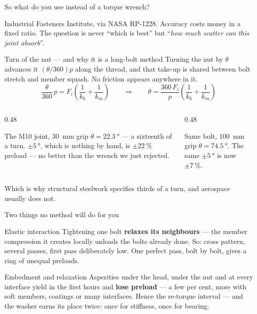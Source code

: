 \documentclass[aspectratio=169,10pt]{beamer}
\begin{document}
\begin{frame}{So what do you use instead of a torque wrench?}
\centering
\resizebox{!}{4.5cm}{}
\vfill
\raggedright
{\footnotesize Industrial Fasteners Institute, via NASA RP-1228.} Accuracy costs money in a fixed
ratio. The question is never ``which is best'' but ``\emph{how much scatter can this joint
absorb}''.
\end{frame}

\begin{frame}{Turn of the nut --- and why it is a long-bolt method}
Turning the nut by $\theta$ advances it $(\theta/360)p$ along the thread, and that take-up is shared
between bolt stretch and member squash. \alert{No friction appears anywhere in it.}
\[
\frac{\theta}{360}\,p = F_i\!\left(\frac{1}{k_b}+\frac{1}{k_m}\right)
\qquad\Longrightarrow\qquad
\theta = \frac{360\,F_i}{p}\left(\frac{1}{k_b}+\frac{1}{k_m}\right)
\]
\vfill
\begin{columns}[T]
\begin{column}{0.48\textwidth}
\begin{block}{The M10 joint, \SI{30}{mm} grip}
$\theta = \SI{22.3}{\degree}$ --- a sixteenth of a turn.
\vspace{2pt}
$\pm\SI{5}{\degree}$, which is nothing by hand, is \alert{$\pm\SI{22}{\percent}$ preload} --- no
better than the wrench we just rejected.
\end{block}
\end{column}
\begin{column}{0.48\textwidth}
\begin{block}{Same bolt, \SI{100}{mm} grip}
$\theta = \SI{74.5}{\degree}$.
\vspace{2pt}
The same $\pm\SI{5}{\degree}$ is now $\pm\SI{7}{\percent}$.
\end{block}
\end{column}
\end{columns}
\vfill
\centering
Which is why structural steelwork specifies thirds of a turn, and aerospace usually does not.
\end{frame}

\begin{frame}{Two things no method will do for you}
\begin{alertblock}{Elastic interaction}
Tightening one bolt \textbf{relaxes its neighbours} --- the member compression it creates locally
unloads the bolts already done.
\vspace{2pt}
So: cross pattern, several passes, first pass deliberately low. One perfect pass, bolt by bolt,
gives a ring of unequal preloads.
\end{alertblock}
\vfill
\begin{alertblock}{Embedment and relaxation}
Asperities under the head, under the nut and at every interface yield in the first hours and
\textbf{lose preload} --- a few per cent, more with soft members, coatings or many interfaces.
\vspace{2pt}
Hence the re-torque interval --- and the washer earns its place twice: once for stiffness, once for
bearing.
\end{alertblock}
\end{frame}
\end{document}
